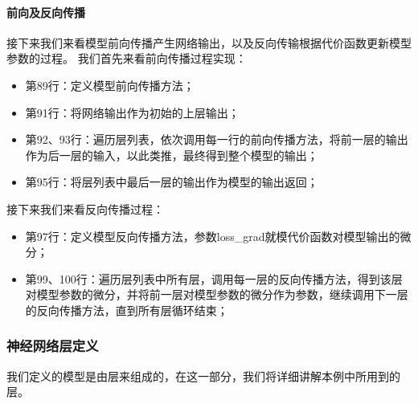 \documentclass[UTF8]{article}
\begin{document}
\paragraph{前向及反向传播}
接下来我们来看模型前向传播产生网络输出，以及反向传输根据代价函数更新模型参数的过程。\newline
我们首先来看前向传播过程实现：
\begin{itemize}
\item 第89行：定义模型前向传播方法；
\item 第91行：将网络输出作为初始的上层输出；
\item 第92、93行：遍历层列表，依次调用每一行的前向传播方法，将前一层的输出作为后一层的输入，以此类推，最终得到整个模型的输出；
\item 第95行：将层列表中最后一层的输出作为模型的输出返回；
\end{itemize}
接下来我们来看反向传播过程：
\begin{itemize}
\item 第97行：定义模型反向传播方法，参数loss\_grad就模代价函数对模型输出的微分；
\item 第99、100行：遍历层列表中所有层，调用每一层的反向传播方法，得到该层对模型参数的微分，并将前一层对模型参数的微分作为参数，继续调用下一层的反向传播方法，直到所有层循环结束；
\end{itemize}
\subsubsection{神经网络层定义}
我们定义的模型是由层来组成的，在这一部分，我们将详细讲解本例中所用到的层。
\end{document}
